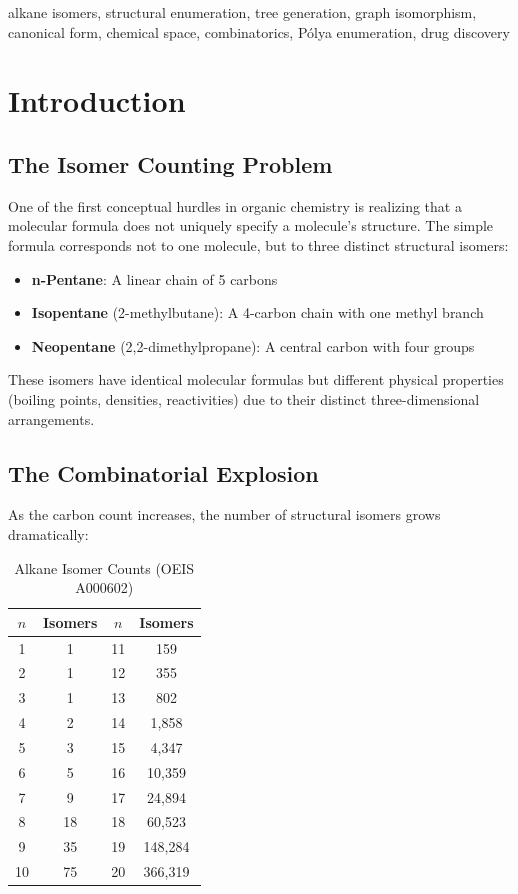 \documentclass[conference]{IEEEtran}
\begin{document}
\begin{IEEEkeywords}
alkane isomers, structural enumeration, tree generation, graph isomorphism, canonical form, chemical space, combinatorics, Pólya enumeration, drug discovery
\end{IEEEkeywords}

\section{Introduction}

\subsection{The Isomer Counting Problem}

One of the first conceptual hurdles in organic chemistry is realizing that a molecular formula does not uniquely specify a molecule's structure. The simple formula  corresponds not to one molecule, but to three distinct structural isomers:

\begin{itemize}
    \item \textbf{n-Pentane}: A linear chain of 5 carbons
    \item \textbf{Isopentane} (2-methylbutane): A 4-carbon chain with one methyl branch
    \item \textbf{Neopentane} (2,2-dimethylpropane): A central carbon with four  groups
\end{itemize}

These isomers have identical molecular formulas but different physical properties (boiling points, densities, reactivities) due to their distinct three-dimensional arrangements.

\subsection{The Combinatorial Explosion}

As the carbon count increases, the number of structural isomers grows dramatically:

\begin{table}[htbp]
\caption{Alkane Isomer Counts (OEIS A000602)}
\label{tab:counts}
\centering
\begin{tabular}{cc|cc}
\toprule
$n$ & Isomers & $n$ & Isomers \\
\midrule
1 & 1 & 11 & 159 \\
2 & 1 & 12 & 355 \\
3 & 1 & 13 & 802 \\
4 & 2 & 14 & 1,858 \\
5 & 3 & 15 & 4,347 \\
6 & 5 & 16 & 10,359 \\
7 & 9 & 17 & 24,894 \\
8 & 18 & 18 & 60,523 \\
9 & 35 & 19 & 148,284 \\
10 & 75 & 20 & 366,319 \\
\bottomrule
\end{tabular}
\end{table}
\end{document}
